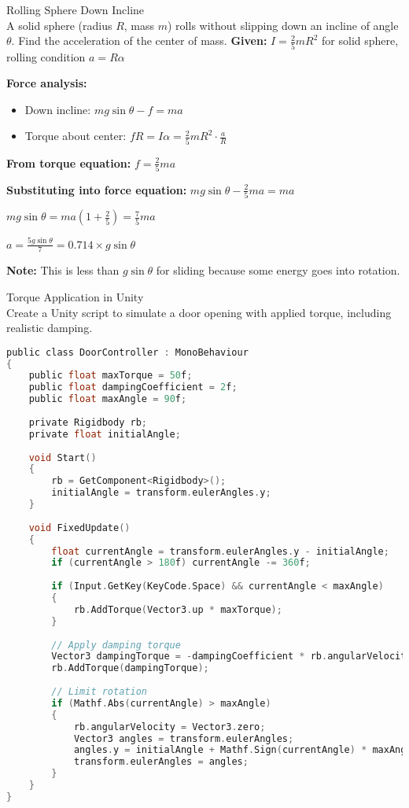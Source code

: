 \begin{example2}{Rolling Sphere Down Incline}\\
    A solid sphere (radius $R$, mass $m$) rolls without slipping down an incline of angle $\theta$. Find the acceleration of the center of mass.
    \tcblower
    \textbf{Given:} $I = \frac{2}{5}mR^2$ for solid sphere, rolling condition $a = R\alpha$
    
    \textbf{Force analysis:}
    \begin{itemize}
        \item Down incline: $mg\sin\theta - f = ma$
        \item Torque about center: $fR = I\alpha = \frac{2}{5}mR^2 \cdot \frac{a}{R}$
    \end{itemize}
    
    \textbf{From torque equation:} $f = \frac{2}{5}ma$
    
    \textbf{Substituting into force equation:}
    $mg\sin\theta - \frac{2}{5}ma = ma$
    
    $mg\sin\theta = ma(1 + \frac{2}{5}) = \frac{7}{5}ma$
    
    $a = \frac{5g\sin\theta}{7} = 0.714 \times g\sin\theta$
    
    \textbf{Note:} This is less than $g\sin\theta$ for sliding because some energy goes into rotation.
\end{example2}

\begin{example2}{Torque Application in Unity}\\
    Create a Unity script to simulate a door opening with applied torque, including realistic damping.
    \tcblower
\begin{lstlisting}[language=C, style=basesmol]
public class DoorController : MonoBehaviour 
{
    public float maxTorque = 50f;
    public float dampingCoefficient = 2f;
    public float maxAngle = 90f;
    
    private Rigidbody rb;
    private float initialAngle;
    
    void Start() 
    {
        rb = GetComponent<Rigidbody>();
        initialAngle = transform.eulerAngles.y;
    }
    
    void FixedUpdate() 
    {
        float currentAngle = transform.eulerAngles.y - initialAngle;
        if (currentAngle > 180f) currentAngle -= 360f;
        
        if (Input.GetKey(KeyCode.Space) && currentAngle < maxAngle) 
        {
            rb.AddTorque(Vector3.up * maxTorque);
        }
        
        // Apply damping torque
        Vector3 dampingTorque = -dampingCoefficient * rb.angularVelocity;
        rb.AddTorque(dampingTorque);
        
        // Limit rotation
        if (Mathf.Abs(currentAngle) > maxAngle) 
        {
            rb.angularVelocity = Vector3.zero;
            Vector3 angles = transform.eulerAngles;
            angles.y = initialAngle + Mathf.Sign(currentAngle) * maxAngle;
            transform.eulerAngles = angles;
        }
    }
}
\end{lstlisting}
\end{example2}